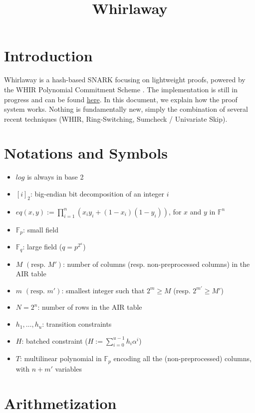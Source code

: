 \documentclass{article}
\title{Whirlaway}
\author{}
\date{}
\newcommand{\Fp}{\mathbb F_p}
\newcommand{\Fq}{\mathbb F_q}
\newcommand{\Pol}{T}
\begin{document}
\maketitle

\section{Introduction}

Whirlaway is a hash-based SNARK focusing on lightweight proofs, powered by the WHIR Polynomial Commitment Scheme \cite{whir}. The implementation is still in progress and can be found \href{https://github.com/TomWambsgans/Whirlaway}{here}. In this document, we explain how the proof system works. Nothing is fundamentally new, simply the combination of several recent techniques (WHIR, Ring-Switching, Sumcheck /  Univariate Skip).

\section{Notations and Symbols}

\begin{itemize}
    \item $log$ is always in base 2
    \item $[i]_2$: big-endian bit decomposition of an integer $i$
    \item $eq(x, y) := \prod_{i = 1}^{n} (x_i y_i + (1 - x_i) (1 - y_i))$, for $x$ and $y$ in $\mathbb F^n$
    \item $\Fp$: small field
    \item $\Fq$: large field ($q = p^{2^\kappa}$)
    \item $M$ $(\text{resp. } M')$: number of columns (resp. non-preprocessed columns) in the AIR table
    \item $m$ $(\text{resp. } m')$: smallest integer such that $2^m \geq M$ (resp. $2^{m'} \geq M'$)
    \item $N = 2^n$: number of rows in the AIR table
    \item $h_1, \dots, h_u$: transition constraints
    \item $H$: batched constraint ($H := \sum_{i=0}^{u-1} h_i \alpha^i $)
    \item $\Pol$: multilinear polynomial in $\Fp$ encoding all the (non-preprocessed) columns, with $n + m'$ variables
\end{itemize}

\section{Arithmetization}
\end{document}
